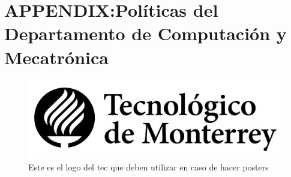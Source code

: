 \documentclass[letterpaper, 10 pt, conference]{ieeeconf}  %
\begin{document}
\pagebreak %
\section*{APPENDIX:Políticas del Departamento de Computación y Mecatrónica}

   
  \begin{figure}[thpb]
      \centering
      \includegraphics[scale=0.2]{logo_tec}
      \caption{Este es el logo del tec que deben utilizar en caso de hacer posters}
      \label{figuraLogoTec}
   \end{figure}
 
\end{document}
